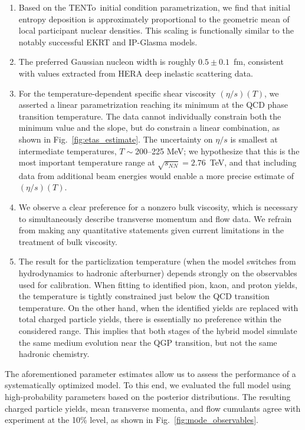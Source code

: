 \documentclass[aps,prc,reprint,amsmath,nofootinbib]{revtex4-1}
\newcommand{\trento}{T\raisebox{-0.5ex}{R}ENTo}
\newcommand{\sqrts}{\sqrt{s_{NN}}}
\begin{document}
\begin{enumerate}[itemsep=0pt, leftmargin=2\parindent]
  \item
    Based on the \trento\ initial condition parametrization, we find that initial entropy deposition is approximately proportional to the geometric mean of local participant nuclear densities.
    This scaling is functionally similar to the notably successful EKRT and IP-Glasma models.
  \item
    The preferred Gaussian nucleon width is roughly $0.5 \pm 0.1$~fm, consistent with values extracted from HERA deep inelastic scattering data.
  \item
    For the temperature-dependent specific shear viscosity $(\eta/s)(T)$, we asserted a linear parametrization reaching its minimum at the QCD phase transition temperature.
    The data cannot individually constrain both the minimum value and the slope, but do constrain a linear combination, as shown in Fig.~\ref{fig:etas_estimate}.
    The uncertainty on $\eta/s$ is smallest at intermediate temperatures, $T \sim {}$200--225 MeV;
    we hypothesize that this is the most important temperature range at $\sqrts = 2.76$~TeV,
    and that including data from additional beam energies would enable a more precise estimate of $(\eta/s)(T)$.
  \item
    We observe a clear preference for a nonzero bulk viscosity, which is necessary to simultaneously describe transverse momentum and flow data.
    We refrain from making any quantitative statements given current limitations in the treatment of bulk viscosity.
  \item
    The result for the particlization temperature (when the model switches from hydrodynamics to hadronic afterburner) depends strongly on the observables used for calibration.
    When fitting to identified pion, kaon, and proton yields, the temperature is tightly constrained just below the QCD transition temperature.
    On the other hand, when the identified yields are replaced with total charged particle yields, there is essentially no preference within the considered range.
    This implies that both stages of the hybrid model simulate the same medium evolution near the QGP transition, but not the same hadronic chemistry.
\end{enumerate}

The aforementioned parameter estimates allow us to assess the performance of a systematically optimized model.
To this end, we evaluated the full model using high-probability parameters based on the posterior distributions.
The resulting charged particle yields, mean transverse momenta, and flow cumulants agree with experiment at the 10\% level, as shown in Fig.~\ref{fig:mode_observables}.
\end{document}
